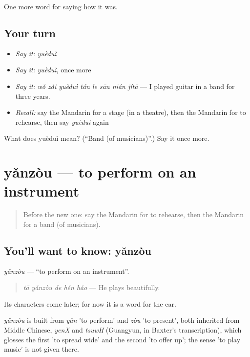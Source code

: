 \begin{grammarlens}[title={What you've built}]
One more word for saying how it was.
\end{grammarlens}

\subsection*{Your turn}
\begin{itemize}
\raggedright
  \item \emph{Say it:} \emph{yuèduì}
  \item \emph{Say it:} \emph{yuèduì}, once more
  \item \emph{Say it:} \emph{wǒ zài yuèduì tán le sān nián jítā} — I played guitar in a band for three years.
  \item \emph{Recall:} say the Mandarin for a stage (in a theatre), then the Mandarin for to rehearse, then say \emph{yuèduì} again
\end{itemize}

\begin{tcolorbox}[breakable,colback=teal!4,colframe=teal!35!black,title={Before you move on}]
What does yuèduì mean? (\textquotedblleft{}Band (of musicians)\textquotedblright{}.) Say it once more.
\end{tcolorbox}
\section[yǎnzòu]{yǎnzòu — to perform on an instrument}

\label{lesson:ZH-C506-yanzou}



\begin{quote}
Before the new one: say the Mandarin for to rehearse, then the Mandarin for a band (of musicians).
\end{quote}

\subsection*{You'll want to know: yǎnzòu}
\emph{yǎnzòu} — \textquotedblleft{}to perform on an instrument\textquotedblright{}.

\begin{quote}
\emph{tā yǎnzòu de hěn hǎo} — He plays beautifully.
\end{quote}

Its characters come later; for now it is a word for the ear.

\begin{cousinweb}
\emph{yǎnzòu} is built from \emph{yǎn} 'to perform' and \emph{zòu} 'to present', both inherited from Middle Chinese, \emph{yenX} and \emph{tsuwH} (Guangyun, in Baxter's transcription), which glosses the first 'to spread wide' and the second 'to offer up'; the sense 'to play music' is not given there.
\end{cousinweb}

